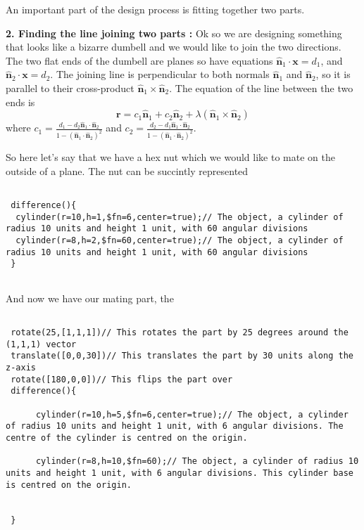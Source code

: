 An important part of the design process is fitting together two parts. 

\textbf{2. Finding the line joining two parts :} Ok so we are designing something that looks like a bizarre dumbell and we would like to join the two directions. The two flat ends of the dumbell are planes so have equations $\hat{\textbf{n}}_{1} \cdot \textbf{x} = d_{1}$, and $\hat{\textbf{n}}_{2} \cdot \textbf{x} = d_{2}$. The joining line is perpendicular to both normals $\hat{\textbf{n}}_{1}$ and $\hat{\textbf{n}}_{2}$, so it is parallel to their cross-product $\hat{\textbf{n}}_{1} \times \hat{\textbf{n}}_{2}$. 
The equation of the line between the two ends is
\begin{equation}
 \textbf{r} = c_{1} \hat{\textbf{n}}_{1} + c_{2} \hat{\textbf{n}}_{2} + \lambda \left( \hat{\textbf{n}}_{1} \times \hat{\textbf{n}}_{2} \right)
\end{equation}
where $c_{1} = \frac{d_{1} - d_{2} \hat{\textbf{n}}_{1} \cdot \hat{\textbf{n}}_{2} }{1 - \left( \hat{\textbf{n}}_{1} \cdot \hat{\textbf{n}}_{2} \right)^{2} }$ and $c_{2} = \frac{d_{2} - d_{1} \hat{\textbf{n}}_{1} \cdot \hat{\textbf{n}}_{2} }{1 - \left( \hat{\textbf{n}}_{1} \cdot \hat{\textbf{n}}_{2} \right)^{2} }$. 

So here let's say that we have a hex nut which we would like to mate on the outside of a plane. The nut can be succintly represented 
\begin{verbatim}
 
 difference(){
  cylinder(r=10,h=1,$fn=6,center=true);// The object, a cylinder of radius 10 units and height 1 unit, with 60 angular divisions
  cylinder(r=8,h=2,$fn=60,center=true);// The object, a cylinder of radius 10 units and height 1 unit, with 60 angular divisions
 }
 
 \end{verbatim}

And now we have our mating part, the 

\begin{verbatim}

 rotate(25,[1,1,1])// This rotates the part by 25 degrees around the (1,1,1) vector
 translate([0,0,30])// This translates the part by 30 units along the z-axis
 rotate([180,0,0])// This flips the part over 
 difference(){
     
      cylinder(r=10,h=5,$fn=6,center=true);// The object, a cylinder of radius 10 units and height 1 unit, with 6 angular divisions. The centre of the cylinder is centred on the origin.  

      cylinder(r=8,h=10,$fn=60);// The object, a cylinder of radius 10 units and height 1 unit, with 6 angular divisions. This cylinder base is centred on the origin.  

     
 } 
 \end{verbatim}

